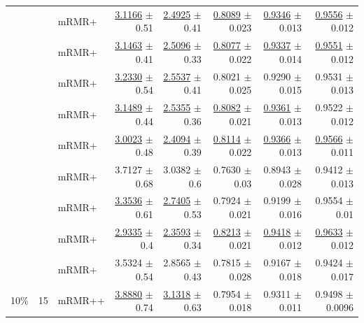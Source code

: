 \begin{longtable}{llp{}rrrrr}
 &  & mRMR+ & \underline{3.1166} {\scriptsize $\pm$ 0.51} & \underline{2.4925} {\scriptsize $\pm$ 0.41} & \underline{0.8089} {\scriptsize $\pm$ 0.023} & \underline{0.9346} {\scriptsize $\pm$ 0.013} & \underline{0.9556} {\scriptsize $\pm$ 0.012} \\
 &  & mRMR+ & \underline{3.1463} {\scriptsize $\pm$ 0.41} & \underline{2.5096} {\scriptsize $\pm$ 0.33} & \underline{0.8077} {\scriptsize $\pm$ 0.022} & \underline{0.9337} {\scriptsize $\pm$ 0.014} & \underline{0.9551} {\scriptsize $\pm$ 0.012} \\
 &  & mRMR+ & \underline{3.2330} {\scriptsize $\pm$ 0.54} & \underline{2.5537} {\scriptsize $\pm$ 0.41} & 0.8021 {\scriptsize $\pm$ 0.025} & 0.9290 {\scriptsize $\pm$ 0.015} & 0.9531 {\scriptsize $\pm$ 0.013} \\
 &  & mRMR+ & \underline{3.1489} {\scriptsize $\pm$ 0.44} & \underline{2.5355} {\scriptsize $\pm$ 0.36} & \underline{0.8082} {\scriptsize $\pm$ 0.021} & \underline{0.9361} {\scriptsize $\pm$ 0.013} & 0.9522 {\scriptsize $\pm$ 0.012} \\
 &  & mRMR+ & \underline{3.0023} {\scriptsize $\pm$ 0.48} & \underline{2.4094} {\scriptsize $\pm$ 0.39} & \underline{0.8114} {\scriptsize $\pm$ 0.022} & \underline{0.9366} {\scriptsize $\pm$ 0.013} & \underline{0.9566} {\scriptsize $\pm$ 0.011} \\
 &  & mRMR+ & 3.7127 {\scriptsize $\pm$ 0.68} & 3.0382 {\scriptsize $\pm$ 0.6} & 0.7630 {\scriptsize $\pm$ 0.03} & 0.8943 {\scriptsize $\pm$ 0.028} & 0.9412 {\scriptsize $\pm$ 0.013} \\
 &  & mRMR+ & \underline{3.3536} {\scriptsize $\pm$ 0.61} & \underline{2.7405} {\scriptsize $\pm$ 0.53} & 0.7924 {\scriptsize $\pm$ 0.021} & 0.9199 {\scriptsize $\pm$ 0.016} & 0.9554 {\scriptsize $\pm$ 0.01} \\
 &  & mRMR+ & \underline{2.9335} {\scriptsize $\pm$ 0.4} & \underline{2.3593} {\scriptsize $\pm$ 0.34} & \underline{0.8213} {\scriptsize $\pm$ 0.021} & \underline{0.9418} {\scriptsize $\pm$ 0.012} & \underline{0.9633} {\scriptsize $\pm$ 0.012} \\
 &  & mRMR+ & 3.5324 {\scriptsize $\pm$ 0.54} & 2.8565 {\scriptsize $\pm$ 0.43} & 0.7815 {\scriptsize $\pm$ 0.028} & 0.9167 {\scriptsize $\pm$ 0.018} & 0.9424 {\scriptsize $\pm$ 0.017} \\
\midrule
10\% & 15 & mRMR++ & \underline{3.8880} {\scriptsize $\pm$ 0.74} & \underline{3.1318} {\scriptsize $\pm$ 0.63} & 0.7954 {\scriptsize $\pm$ 0.018} & 0.9311 {\scriptsize $\pm$ 0.011} & 0.9498 {\scriptsize $\pm$ 0.0096} \\

\end{longtable}
